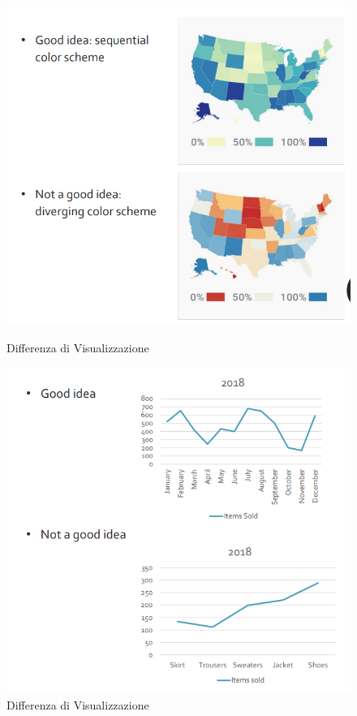 \begin{figure}[H]
    \centering
    \begin{minipage}{0.45\textwidth}
        \centering
        \includegraphics[width=\linewidth]{images/Attrubtevis.png} 
        \caption{Differenza di Visualizzazione}
        \label{fig:immagine1}
    \end{minipage}\hfill
    \begin{minipage}{0.45\textwidth}
        \centering
        \includegraphics[width=\linewidth]{images/Attributevis2.png} %
        \caption{Differenza di Visualizzazione}
        \label{fig:immagine2}
    \end{minipage}
\end{figure}
